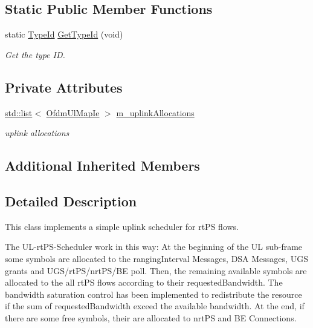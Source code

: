 \subsection*{Static Public Member Functions}
\begin{DoxyCompactItemize}
\item 
static \hyperlink{classns3_1_1TypeId}{Type\+Id} \hyperlink{classns3_1_1UplinkSchedulerRtps_a38423d6562b7e422a5d3de6b3c1a661c}{Get\+Type\+Id} (void)
\begin{DoxyCompactList}\small\item\em Get the type ID. \end{DoxyCompactList}\end{DoxyCompactItemize}
\subsection*{Private Attributes}
\begin{DoxyCompactItemize}
\item 
\hyperlink{openflow-interface_8h_afd9bcfa176617760671b67580f536fa7}{std\+::list}$<$ \hyperlink{classns3_1_1OfdmUlMapIe}{Ofdm\+Ul\+Map\+Ie} $>$ \hyperlink{classns3_1_1UplinkSchedulerRtps_a4cb3da7f31082b64a21b7f9adc7fd2e4}{m\+\_\+uplink\+Allocations}
\begin{DoxyCompactList}\small\item\em uplink allocations \end{DoxyCompactList}\end{DoxyCompactItemize}
\subsection*{Additional Inherited Members}


\subsection{Detailed Description}
This class implements a simple uplink scheduler for rt\+PS flows. 

The U\+L-\/rt\+P\+S-\/\+Scheduler work in this way\+: At the beginning of the UL sub-\/frame some symbols are allocated to the ranging\+Interval Messages, D\+SA Messages, U\+GS grants and U\+G\+S/rt\+P\+S/nrt\+P\+S/\+BE poll. Then, the remaining available symbols are allocated to the all rt\+PS flows according to their requested\+Bandwidth. The bandwidth saturation control has been implemented to redistribute the resource if the sum of requested\+Bandwidth exceed the available bandwidth. At the end, if there are some free symbols, their are allocated to nrt\+PS and BE Connections. 

